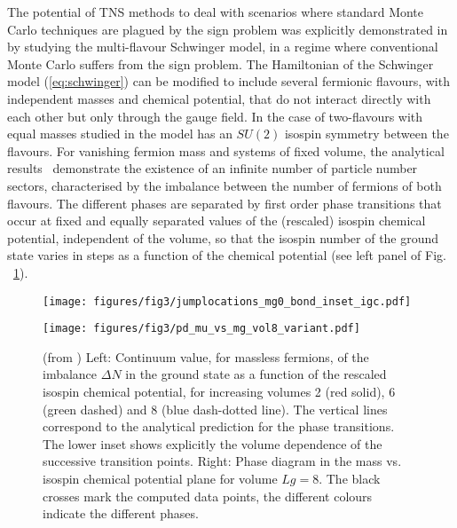 \documentclass[epj,final]{svjour}
\begin{document}
The potential of TNS methods to deal with scenarios where standard Monte Carlo techniques are plagued by the sign problem was explicitly demonstrated in \cite{banuls2017density} by studying the multi-flavour Schwinger model, in a regime where conventional Monte Carlo suffers from the sign problem. The Hamiltonian of the Schwinger model (\ref{eq:schwinger}) can be modified to include several fermionic flavours, with independent masses and chemical potential, that do not interact directly with each other but only through the gauge field. In the case of two-flavours with equal masses studied in \cite{banuls2017density} the model has an $SU(2)$ isospin symmetry between the flavours. For vanishing fermion mass and systems of fixed volume, the analytical results~\cite{Narayanan2012,lohmayer2013phase} demonstrate the existence of an infinite number of particle number sectors, characterised by the imbalance between the number of fermions of both flavours. The different phases are separated by first order phase transitions that occur at fixed and equally separated values of the (rescaled) isospin chemical potential, independent of the volume, so that the isospin number of the ground state varies in steps as a function of the chemical potential (see left panel of Fig. ~\ref{fig:multiflavor}). 

\begin{figure}
\begin{minipage}[b]{.4\columnwidth}
\texttt{[image: figures/fig3/jumplocations\_mg0\_bond\_inset\_igc.pdf]}
\end{minipage}
\hspace{.1\columnwidth}
\begin{minipage}[b]{.4\columnwidth} 
\texttt{[image: figures/fig3/pd\_mu\_vs\_mg\_vol8\_variant.pdf]}
\end{minipage}
\caption{(from \cite{banuls2017density})
Left: Continuum value, for massless fermions, of the imbalance $\Delta N$ in the ground state as a function of the rescaled isospin chemical potential, for increasing volumes 2 (red solid), 6 (green dashed) and 8 (blue dash-dotted line). The vertical lines correspond to the analytical prediction for the phase transitions. The lower inset shows explicitly the volume dependence of the successive transition points. Right: Phase diagram in the mass vs. isospin chemical potential plane for  volume $Lg=8$. The black crosses mark the computed data points, the different colours indicate the different phases.}
\label{fig:multiflavor}
\end{figure}
\end{document}
